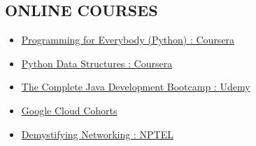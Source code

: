 \documentclass[a4paper,10pt]{article}
\begin{document}
\begin{paracol}{2}
	\section*{ONLINE COURSES}
		\begin{itemize}
			\item \href{https://www.coursera.org/account/accomplishments/certificate/9MSL99K95L8U}{Programming for Everybody (Python) : Coursera}
			\item \href{https://www.coursera.org/account/accomplishments/verify/3H4QGXNK6MPX}{Python Data Structures : Coursera}
			\item \href{https://www.udemy.com/certificate/UC-57fc4962-2320-48d8-b0d2-1b83573ecdd0/}{The Complete Java Development Bootcamp : Udemy}
			\item \href{https://www.cloudskillsboost.google/public_profiles/c9b7367d-4497-45bc-a027-7eaf2bb2bf8f}{Google Cloud Cohorts}
			\item \href{https://drive.google.com/file/d/1J4DTrLUJHfVtcJjgAT6V12THgwveibim/view?usp=sharing}{Demystifying Networking : NPTEL}
		\end{itemize}
		\vspace{1em}

\end{paracol}
\end{document}
